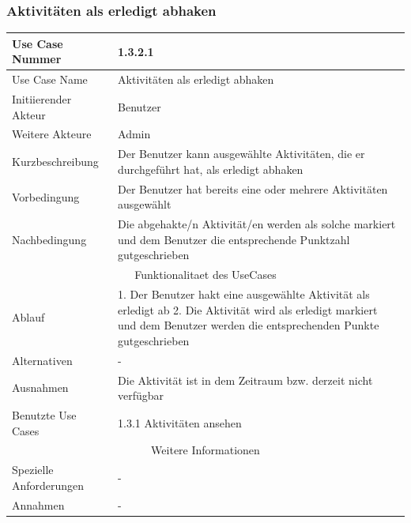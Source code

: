 \documentclass[10pt,a4paper]{article}
\begin{document}
	\subsubsection{Aktivit\"aten als erledigt abhaken}
	\begin{tabular}{|l|p{.5\linewidth}|}
	\hline Use Case Nummer & 1.3.2.1 \\ 
	\hline Use Case Name & Aktivit\"aten als erledigt abhaken \\ 
	\hline Initiierender Akteur & Benutzer \\
	\hline Weitere Akteure & Admin \\
	\hline Kurzbeschreibung & Der Benutzer kann ausgew\"ahlte Aktivit\"aten, die er durchgef\"uhrt hat, als erledigt abhaken \\
	\hline Vorbedingung & Der Benutzer hat bereits eine oder mehrere Aktivit\"aten ausgew\"ahlt \\
	\hline Nachbedingung & Die abgehakte/n Aktivit\"at/en werden als solche markiert und dem Benutzer die entsprechende Punktzahl gutgeschrieben \\
	\hline \multicolumn{2}{|c|}{Funktionalitaet des UseCases}\\
	\hline Ablauf & 1. Der Benutzer hakt eine ausgew\"ahlte Aktivit\"at als erledigt ab 2. Die Aktivit\"at wird als erledigt markiert und dem Benutzer werden die entsprechenden Punkte gutgeschrieben \\
	\hline Alternativen & - \\
	\hline Ausnahmen & Die Aktivit\"at ist in dem Zeitraum bzw. derzeit nicht verf\"ugbar \\
	\hline Benutzte Use Cases & 1.3.1 Aktivit\"aten ansehen \\
	\hline \multicolumn{2}{|c|}{Weitere Informationen} \\
	\hline Spezielle Anforderungen & - \\
	\hline Annahmen & - \\
	\hline
	\end{tabular} 
	
\end{document}
